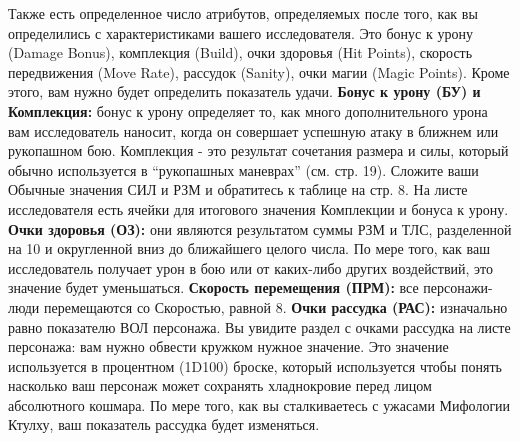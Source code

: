 \documentclass[letterpaper,twocolumn,openany, twoside, 8pt, usenames]{cocbook}
\begin{document}
Также есть определенное число атрибутов, определяемых после того, как вы определились с характеристиками вашего исследователя. Это бонус к урону (Damage Bonus), комплекция (Build), очки здоровья (Hit Points), скорость передвижения (Move Rate), рассудок (Sanity), очки магии (Magic Points). Кроме этого, вам нужно будет определить показатель удачи.
\smallbreak
\noindent \textbf{Бонус к урону (БУ) и Комплекция:} бонус к урону определяет то, как много дополнительного урона вам исследователь наносит, когда он совершает успешную атаку в ближнем или рукопашном бою. Комплекция - это результат сочетания размера и силы, который обычно используется в ``рукопашных маневрах'' (см. стр. 19). Сложите ваши Обычные значения СИЛ и РЗМ и обратитесь к таблице на стр. 8. На листе исследователя есть ячейки для итогового значения Комплекции и бонуса к урону.
\smallbreak
\noindent \textbf{Очки здоровья (ОЗ):} они являются результатом суммы РЗМ и ТЛС, разделенной на 10 и округленной вниз до ближайшего целого числа. По мере того, как ваш исследователь получает урон в бою или от каких-либо других воздействий, это значение будет уменьшаться.
\smallbreak
\noindent {}
\smallbreak
\noindent \textbf{Скорость перемещения (ПРМ):} все персонажи-люди перемещаются со Скоростью, равной 8.
\smallbreak
\noindent \textbf{Очки рассудка (РАС):} изначально равно показателю ВОЛ персонажа. Вы увидите раздел с очками рассудка на листе персонажа: вам нужно обвести кружком нужное значение. Это значение используется в процентном (1D100) броске, который используется чтобы понять насколько ваш персонаж может сохранять хладнокровие перед лицом абсолютного кошмара. По мере того, как вы сталкиваетесь с ужасами Мифологии Ктулху, ваш показатель рассудка будет изменяться.
\smallbreak
\noindent {}
\smallbreak
\end{document}
